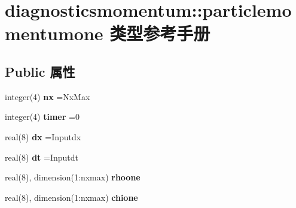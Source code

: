\hypertarget{structdiagnosticsmomentum_1_1particlemomentumone}{}\section{diagnosticsmomentum\+::particlemomentumone 类型参考手册}
\label{structdiagnosticsmomentum_1_1particlemomentumone}
\subsection*{Public 属性}
\begin{DoxyCompactItemize}
\item 
\mbox{\label{structdiagnosticsmomentum_1_1particlemomentumone_acfd89bba9215ef526817e056212e12ea}} 
integer(4) {\bfseries nx} =Nx\+Max
\item 
\mbox{\label{structdiagnosticsmomentum_1_1particlemomentumone_a347dec3b8ed6fa119420f0aee64f4eec}} 
integer(4) {\bfseries timer} =0
\item 
\mbox{\label{structdiagnosticsmomentum_1_1particlemomentumone_a18e7972465fb14449d0097e6c2f0f424}} 
real(8) {\bfseries dx} =Inputdx
\item 
\mbox{\label{structdiagnosticsmomentum_1_1particlemomentumone_a2bb8807ba07fb114d35e46ba74158be0}} 
real(8) {\bfseries dt} =Inputdt
\item 
\mbox{\label{structdiagnosticsmomentum_1_1particlemomentumone_a556e8039ad540a45e7b29456e992e786}} 
real(8), dimension(1\+:nxmax) {\bfseries rhoone}
\item 
\mbox{\label{structdiagnosticsmomentum_1_1particlemomentumone_a30a9fcc89985bd9feb0a12be9425e319}} 
real(8), dimension(1\+:nxmax) {\bfseries chione}
\item 
\mbox{\label{structdiagnosticsmomentum_1_1particlemomentumone_a7e3a7b5c1eb14c5d2e853f7010ff8739}} 

\end{DoxyCompactItemize}

